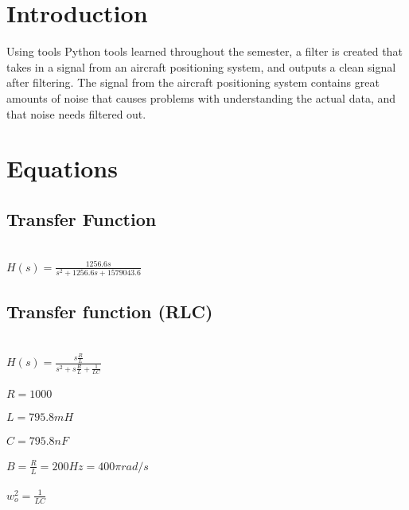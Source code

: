 \documentclass[12pt]{report}
\begin{document}
\section{Introduction}
Using tools Python tools learned throughout the semester, a filter is created that takes in a signal from an aircraft positioning system, and outputs a clean signal after filtering. The signal from the aircraft positioning system contains great amounts of noise that causes problems with understanding the actual data, and that noise needs filtered out.

\section{Equations}
\subsection{Transfer Function}
\\$H(s) = \frac{1256.6s}{s^2+1256.6s+1579043.6}$
\subsection{Transfer function (RLC)}
\\$H(s) = \frac{s\frac{R}{L}}{s^2+s\frac{R}{L}+\frac{1}{LC}}$
\\ \\$R = 1000$
\\ \\$L = 795.8mH$
\\ \\$C = 795.8nF$
\\ \\$B = \frac{R}{L} = 200Hz = 400\pi rad/s$
\\ \\$w_o^2 = \frac{1}{LC}$
\end{document}
